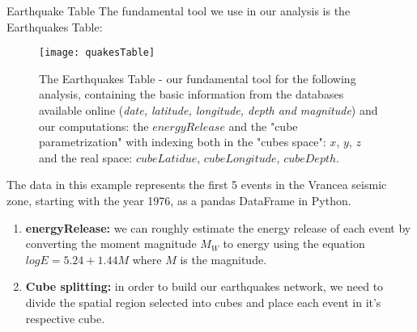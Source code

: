 \begin{frame}{Earthquake Table}
The fundamental tool we use in our analysis is the Earthquakes Table:

\begin{figure}[!h]

\centering
\texttt{[image: quakesTable]}
\caption{The Earthquakes Table - our fundamental tool for the following analysis, containing the basic information from the databases available online ({\it date, latitude, longitude, depth and magnitude}) and our computations: the $energyRelease$ and the "cube parametrization" with indexing both in the "cubes space": $x$, $y$, $z$ and the real space: $cubeLatidue$, $cubeLongitude$, $cubeDepth$.\\ }
\label{fig:quakesTable}
\end{figure}
The data in this example represents the first 5 events in the Vrancea seismic zone, starting with the year 1976, as a pandas DataFrame in Python.

\end{frame}

\begin{frame}
\begin{enumerate}
	\item {\bf energyRelease:} we can roughly estimate the energy release of each event by converting the moment magnitude $M_W$ to energy using the equation $log E = 5.24 + 1.44M$ where $M$ is the magnitude. 
	\item {\bf Cube splitting:} in order to build our earthquakes network, we need to divide the spatial region selected into cubes and place each event in it's respective cube.
\end{enumerate}

\begin{figure}[h!]
\centering
{}%
\hspace*{3cm}%
\end{figure}

\end{frame}

